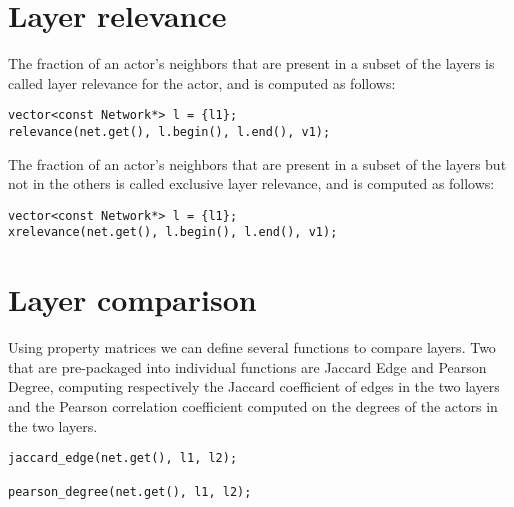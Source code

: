 \section{Layer relevance}

The fraction of an actor's neighbors that are present in a subset of the layers is called layer relevance for the actor, and is computed as follows:
\begin{lstlisting}[style=c++]
vector<const Network*> l = {l1};
relevance(net.get(), l.begin(), l.end(), v1);
\end{lstlisting}

The fraction of an actor's neighbors that are present in a subset of the layers but not in the others is called exclusive layer relevance, and is computed as follows:
\begin{lstlisting}[style=c++]
vector<const Network*> l = {l1};
xrelevance(net.get(), l.begin(), l.end(), v1);
\end{lstlisting}

\section{Layer comparison}

Using property matrices we can define several functions to compare layers. Two that are pre-packaged into individual functions are Jaccard Edge and Pearson Degree, computing respectively the Jaccard coefficient of edges in the two layers and the Pearson correlation coefficient computed on the degrees of the actors in the two layers.
\begin{lstlisting}[style=c++]
jaccard_edge(net.get(), l1, l2);

pearson_degree(net.get(), l1, l2);
\end{lstlisting}
